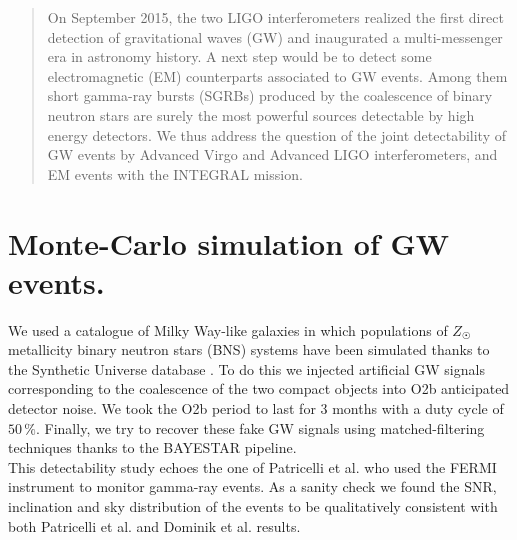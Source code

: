 \documentclass[a0,portrait]{a0poster}
\begin{document}
\begin{multicols}{2} %


\begin{abstract}
On September 2015, the two LIGO interferometers realized the first direct detection of gravitational waves (GW) and inaugurated a multi-messenger era in astronomy history. A next step would be to detect some electromagnetic (EM) counterparts associated to GW events. Among them short gamma-ray bursts (SGRBs) produced by the coalescence of binary neutron stars are surely the most powerful sources detectable by high energy detectors. We thus address the question of the joint detectability of GW events by Advanced Virgo and Advanced LIGO interferometers, and EM events with the INTEGRAL mission.%
 \end{abstract}

\section*{Monte-Carlo simulation of GW events.}


\indent We used a catalogue of Milky Way-like galaxies in which populations of $Z_{\astrosun}$ metallicity binary neutron stars (BNS) systems have been simulated thanks to the Synthetic Universe database \cite{syntheticUniverse}. To do this we injected artificial GW signals corresponding to the coalescence of the two compact objects into O2b anticipated detector noise.  We took the O2b period to last for 3 months with a duty cycle of $50 \, \%$. Finally, we try to recover these fake GW signals using matched-filtering techniques thanks to the BAYESTAR pipeline. \\
\indent This detectability study echoes the one of Patricelli et al. \cite{2016arXiv160606124P} who used the \textsc{FERMI} instrument to monitor gamma-ray events.  As a sanity check we found the SNR, inclination and sky distribution of the events to be qualitatively consistent with both Patricelli et al. and Dominik et al. \cite{2012ApJ...759...52D} results. \\



\end{multicols}
\end{document}
